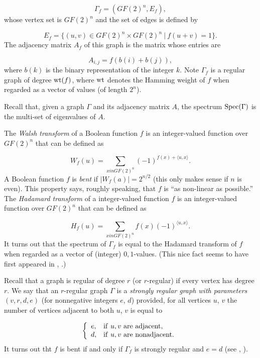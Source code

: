 \[
             \Gamma_f = (GF(2)^n, E_f ),
\]
whose vertex set is $GF(2)^n$ and the set of edges is defined by

\[
            E_f =\{ (u,v) \in GF(2)^n \times GF(2)^n \ |\ f(u+v)=1\}.
\]
The adjacency matrix $A_f$ of this graph is the matrix whose entries are

\[
        A_{i,j} = f(b(i) + b(j)),
\]
where $b(k)$ is the binary representation of the integer $k$.
Note $\Gamma_f$ is a regular graph of degree ${\rm wt}(f)$, 
where ${\rm wt}$ denotes the 
Hamming weight of $f$ when regarded as a vector of values (of length $2^n$).

Recall that, given a graph $\Gamma$ and its adjacency matrix $A$, the 
spectrum ${\rm Spec}(\Gamma)$ is the multi-set of eigenvalues of $A$.

The {\it Walsh transform} of a Boolean function $f$ is an integer-valued 
function over $GF(2)^n$ that can be defined as

\[
W_f(u) = \sum_{x in GF(2)^n} (-1)^{f(x)+ \langle u,x\rangle}.
\]
A Boolean function $f$ is {\it bent} if $|W_f(a)| = 2^{n/2}$ (this only makes 
sense if $n$ is even). This property says, roughly speaking, that
$f$ is ``as non-linear as possible.''
The {\it Hadamard transform} of a integer-valued 
function $f$ is an integer-valued function over $GF(2)^n$ that can be defined as

\[
H_f(u) = \sum_{x in GF(2)^n} f(x)(-1)^{\langle u,x\rangle}.
\]
It turns out that the spectrum of $\Gamma_f$ is equal to the Hadamard 
transform of $f$ when regarded as a vector of (integer) $0,1$-values. 
(This nice fact seems to have first appeared in \cite{Bernasconi1998},
\cite{BernasconiEtAl1999}.)

Recall that a graph is regular of degree $r$ (or $r$-regular) if every vertex has 
degree $r$.    We say that an $r$-regular 
graph $\Gamma$ is a {\it strongly regular graph with parameters $(v, r, d, e)$}  
(for nonnegative integers $e$, $d$) provided, for all vertices $u$, $v$ the number 
of vertices adjacent to both $u$, $v$ is equal to

\[
\left\{
\begin{array}{ll}
e, & {\rm if\ }u, v {\rm \ are\ adjacent},\\
d, & {\rm if\ }u, v {\rm \ are\ nonadjacent}.\\
\end{array}
\right.
\]
It turns out tht $f$ is bent if and only if 
$\Gamma_f$ is strongly regular and $e = d$ (see \cite{BernasconiEtAl1999},
\cite{BernasconiEtAl2001}).

